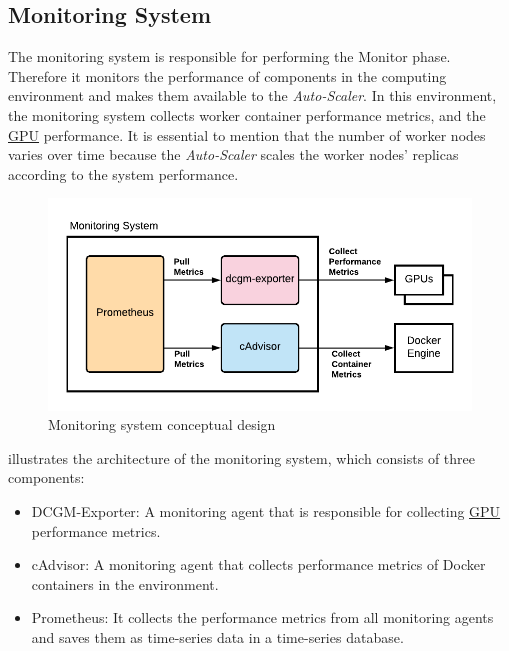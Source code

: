 \subsection{Monitoring System}
The monitoring system is responsible for performing the Monitor phase. Therefore it monitors the performance of components in the computing environment and makes them available to the \textit{Auto-Scaler}.
In this environment, the monitoring system collects worker container performance metrics, and the \hyperlink{abbr:gpu}{GPU} performance. It is essential to mention that the number of worker nodes varies over time because the \textit{Auto-Scaler} scales the worker nodes' replicas according to the system performance.
\begin{figure}[h]
\centering
\includegraphics[scale=1]{images/05_conceptual_design/autonomic_manager/monitoring_system_concept}
\caption{Monitoring system conceptual design}
\label{fig:05_am_monitoring_concept}
\end{figure}
 illustrates the architecture of the monitoring system, which consists of three components:
\begin{itemize}
\item DCGM-Exporter: A monitoring agent that is responsible for collecting \hyperlink{abbr:gpu}{GPU} performance metrics.

\item cAdvisor: A monitoring agent that collects performance metrics of Docker containers in the environment.

\item Prometheus: It collects the performance metrics from all monitoring agents and saves them as time-series data in a time-series database.
\end{itemize}


